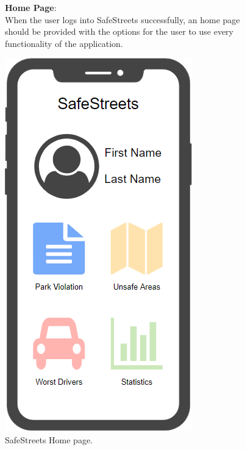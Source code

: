 \begin{figure}
	\begin{flushleft}
		\textbf{Home Page}:\\
		When the user logs into SafeStreets successfully, an home page should be provided with the options for the user to use every functionality of the application.
	\end{flushleft}
	\centering
	\includegraphics[width=0.6\linewidth]{images/mockups/homePage}
	\caption{SafeStreets Home page.}
	\label{fig:home}
\end{figure}
\clearpage
